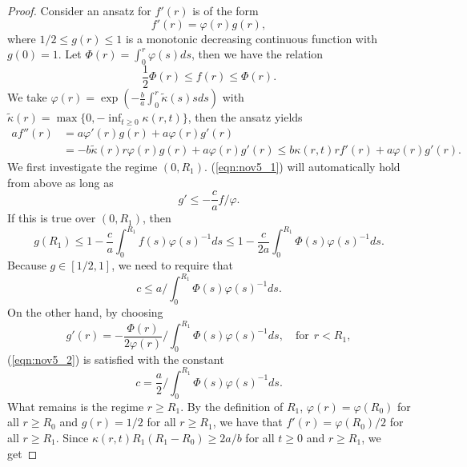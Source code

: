 \documentclass[11pt]{article}
\newcommand{\1}{\mathds{1}}
\begin{document}
\begin{proof}
    Consider an ansatz for $f'(r)$ is of the form
    \begin{equation}\label{eqn:dec3_4}
        f'(r) = \varphi(r) g(r),
    \end{equation}
    where $1/2\leq g(r)\leq 1$ is a monotonic decreasing continuous function with $g(0)=1$. Let $\Phi(r) = \int_0^r \varphi(s) ds$, then we have the relation 
    \begin{equation}
        \frac{1}{2}\Phi(r)\leq f(r)\leq \Phi(r).
    \end{equation}
    We take $\varphi(r) = \exp(-\frac{b}{a}\int_0^r \tilde{\kappa}(s)sds)$ with $\tilde{\kappa}(r) = \max\{0, -\inf_{t\geq0}\kappa(r,t)\}$, then the ansatz yields
    \begin{equation}
    \begin{aligned}
        a f''(r) &= a \varphi'(r) g(r) + a \varphi(r) g'(r)\\
        &= -b \tilde{\kappa}(r) r \varphi(r) g(r) + a \varphi(r) g'(r) \leq  b \kappa(r,t) r f'(r) + a \varphi(r) g'(r).
         \end{aligned}
    \end{equation}
   We first investigate  the regime $(0,R_1)$.  (\ref{eqn:nov5_1})  will automatically hold from above as long as
    \begin{equation}\label{eqn:nov5_2}
        g'\leq -\frac{c}{a} f/\varphi.
    \end{equation}
If this is true over $(0,R_1)$, then
\begin{equation}
    g(R_1)\leq 1-\frac{c}{a}\int_0^{R_1} f(s)\varphi(s)^{-1}ds\leq 1-\frac{c}{2a}\int_0^{R_1} \Phi(s)\varphi(s)^{-1}ds.
\end{equation}
Because $g\in[1/2,1]$, we need to require that
\begin{equation}\label{eqn:dec3_up}
    c\leq a \Big/ \int_0^{R_1} \Phi(s)\varphi(s)^{-1}ds.
\end{equation}
On the other hand, by choosing 
\begin{equation}
    g'(r) = -\frac{\Phi(r)}{2\varphi(r)} \Big/ \int_0^{R_1} \Phi(s)\varphi(s)^{-1}ds, \quad \text{for}~~ r<R_1,
\end{equation}
(\ref{eqn:nov5_2}) is satisfied with the constant
\begin{equation}\label{eqn:dec3_eq}
    c= \frac{a}{2} \Big/ \int_0^{R_1} \Phi(s)\varphi(s)^{-1}ds.
\end{equation}
What remains is the regime $r\geq R_1$. By the definition of $R_1$, $\varphi(r)=\varphi(R_0)$ for all $r\geq R_0$ and $g(r) = 1/2$ for all $r\geq R_1$, we have that $f'(r) = \varphi(R_0)/2$ for all $r\geq R_1$. Since $\kappa(r,t)R_1(R_1-R_0)\geq 2a/b$ for all $t\geq 0$ and $r\geq R_1$, we get

\end{proof}
\end{document}

